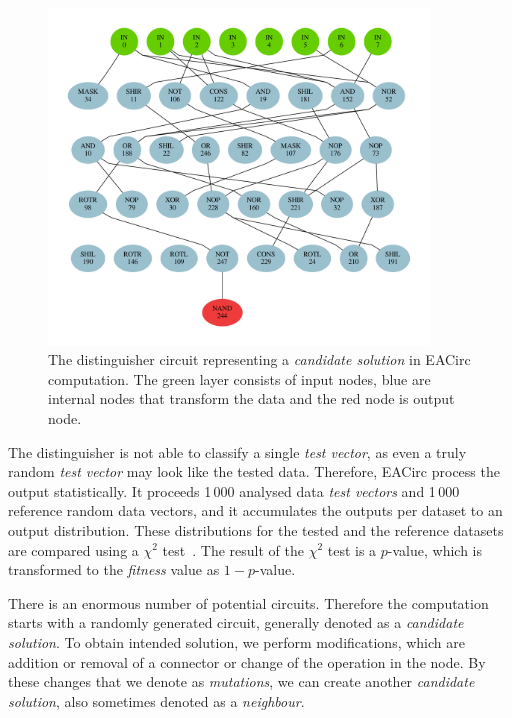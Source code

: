 \documentclass[
    digital,    %
    oneside,    %
    color,
    11pt,
    nocover,
    notable,
    nolof,
    nolot,
]{fithesis3}
\begin{document}
\begin{figure}[h]
  \centering
  \includegraphics[width=0.9\textwidth]{./graphics/gls/circuit}
\caption{The distinguisher circuit representing a \textit{candidate solution} in EACirc computation. The green layer consists of input nodes, blue are internal nodes that transform the data and the red node is output node.}
\label{fig:eac-circuit}
\end{figure}

The distinguisher is not able to classify a single \textit{test vector}, as even a truly random \textit{test vector} may look like the tested data. Therefore, EACirc process the output statistically. It proceeds 1\,000 analysed data \textit{test vectors} and 1\,000 reference random data vectors, and it accumulates the outputs per dataset to an output distribution. These distributions for the tested and the reference datasets are compared using a $\chi^{2}$ test~\cite[p.~219]{stat-handbook}. The result of the $\chi^{2}$ test is a $p$-value, which is transformed to the \textit{fitness} value as $1 - p$-value.

There is an enormous number of potential circuits. Therefore the computation starts with a randomly generated circuit, generally denoted as a \textit{candidate solution}. To obtain intended solution, we perform modifications, which are addition or removal of a connector or change of the operation in the node. By these changes that we denote as \textit{mutations}, we can create another \textit{candidate solution}, also sometimes denoted as a \textit{neighbour}.
\end{document}
